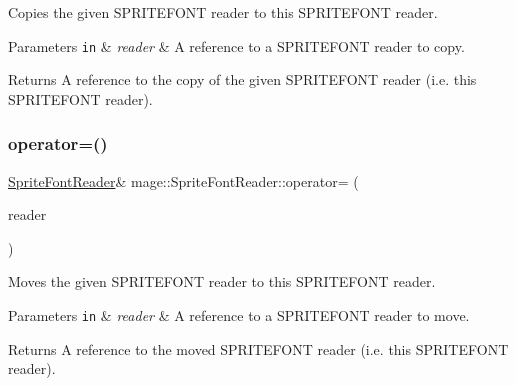 Copies the given S\+P\+R\+I\+T\+E\+F\+O\+NT reader to this S\+P\+R\+I\+T\+E\+F\+O\+NT reader.


\begin{DoxyParams}[1]{Parameters}
\mbox{\tt in}  & {\em reader} & A reference to a S\+P\+R\+I\+T\+E\+F\+O\+NT reader to copy. \\
\hline
\end{DoxyParams}
\begin{DoxyReturn}{Returns}
A reference to the copy of the given S\+P\+R\+I\+T\+E\+F\+O\+NT reader (i.\+e. this S\+P\+R\+I\+T\+E\+F\+O\+NT reader). 
\end{DoxyReturn}
\hypertarget{classmage_1_1_sprite_font_reader_aae3c6305ea97146bd85b2d93a037d47d}{}\label{classmage_1_1_sprite_font_reader_aae3c6305ea97146bd85b2d93a037d47d} 
\subsubsection{\texorpdfstring{operator=()}{operator=()}\hspace{0.1cm}{\footnotesize\ttfamily [2/2]}}
{\footnotesize\ttfamily \hyperlink{classmage_1_1_sprite_font_reader}{Sprite\+Font\+Reader}\& mage\+::\+Sprite\+Font\+Reader\+::operator= (\begin{DoxyParamCaption}\item[{\hyperlink{classmage_1_1_sprite_font_reader}{Sprite\+Font\+Reader} \&\&}]{reader }\end{DoxyParamCaption})\hspace{0.3cm}{\ttfamily [delete]}}

Moves the given S\+P\+R\+I\+T\+E\+F\+O\+NT reader to this S\+P\+R\+I\+T\+E\+F\+O\+NT reader.


\begin{DoxyParams}[1]{Parameters}
\mbox{\tt in}  & {\em reader} & A reference to a S\+P\+R\+I\+T\+E\+F\+O\+NT reader to move. \\
\hline
\end{DoxyParams}
\begin{DoxyReturn}{Returns}
A reference to the moved S\+P\+R\+I\+T\+E\+F\+O\+NT reader (i.\+e. this S\+P\+R\+I\+T\+E\+F\+O\+NT reader). 
\end{DoxyReturn}
\hypertarget{classmage_1_1_sprite_font_reader_af380ae127285a88ae41e35a9067db412}{}\label{classmage_1_1_sprite_font_reader_af380ae127285a88ae41e35a9067db412} 
